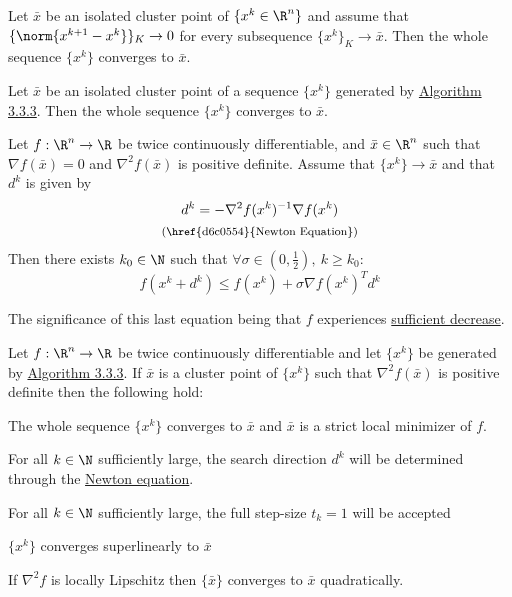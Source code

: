 Let $\bar x$ be an isolated cluster point of $\{x^k\in\R^n\}$ and
assume that $\{\norm{x^{k+1}-x^k}\}_K\to0$ for every subsequence
$\{x^k\}_K\to\bar x$. Then the whole sequence $\{x^k\}$ converges to
$\bar x$.

\label{aabc89a}

Let $\bar x$ be an isolated cluster point of a sequence $\{x^k\}$
generated by \href{a7a5665}{Algorithm 3.3.3}. Then the whole sequence
$\{x^k\}$ converges to $\bar x$.

\label{d6d6148}

Let $f:\R^n\to\R$ be twice continuously differentiable, and $\bar
	x\in\R^n$ such that $\nabla f(\bar x)=0$ and $\nabla^2f(\bar x)$ is
positive definite. Assume that $\{x^k\}\to\bar x$ and that $d^k$ is
given by
\begin{gather*}
	d^k = -\nabla^2f(x^k)^{-1}\nabla f(x^k) \\
	\text{\footnotesize{(\href{d6c0554}{Newton Equation})}}
\end{gather*}
Then there exists $k_0\in\N$ such that $\forall\sigma\in(0,\frac12),\ k\geq k_0$:
$$
	f(x^k+d^k)\leq f(x^k)+\sigma\nabla f(x^k)^Td^k
$$

The significance of this last equation being that $f$ experiences
\href{fefb024}{sufficient decrease}.

\label{e58830c}

Let $f:\R^n\to\R$ be twice continuously differentiable and let
$\{x^k\}$ be generated by \href{a7a5665}{Algorithm 3.3.3}. If $\bar x$
is a cluster point of $\{x^k\}$ such that $\nabla^2f(\bar x)$ is
positive definite then the following hold:
\begin{enumerata}
\item The whole sequence $\{x^k\}$ converges to $\bar x$ and $\bar x$
  is a strict local minimizer of $f$.
\item For all $k\in\N$ sufficiently large, the search direction $d^k$
  will be determined through the \href{d6c0554}{Newton equation}.
\item For all $k\in\N$ sufficiently large, the full step-size $t_k=1$
  will be accepted
\item $\{x^k\}$ converges superlinearly to $\bar x$
\item If $\nabla^2f$ is locally Lipschitz then $\{\bar x\}$ converges
  to $\bar x$ quadratically.
\end{enumerata}

